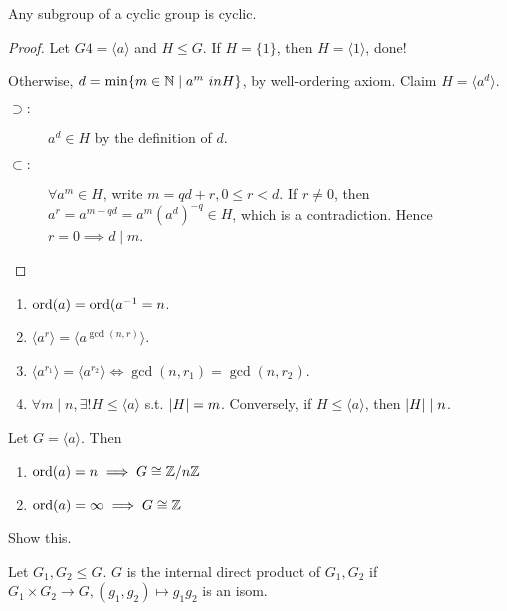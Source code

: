 \begin{prop}
  Any subgroup of a cyclic group is cyclic.
  \begin{proof}
    Let $G4 = \langle a \rangle$ and $H \le G$. If $H = \{1\}$, then
    $H = \langle 1 \rangle$, done!

    Otherwise, $d = \min \{ m \in \mathbb{N} \mid a^m \ in H \}$, by well-ordering
    axiom. Claim $H = \langle a^d \rangle$.
    \begin{description}
      \item[$\supset:$] $a^d \in H$ by the definition of $d$.
      \item[$\subset:$] $\forall a^m \in H$, write $m = qd + r, 0 \le r < d$.
        If $r \ne 0$, then $a^r = a^{m - qd} = a^m (a^d)^{-q} \in H$, which
        is a contradiction. Hence $r = 0 \implies d \mid m$.
    \end{description}
  \end{proof}
\end{prop}

\begin{exercise} \mbox{}
  \begin{enumerate}
    \item $\operatorname{ord}(a) = \operatorname{ord}(a^{-1} = n$.
    \item $\langle a^r \rangle = \langle a^{\gcd(n, r)} \rangle$.
    \item $\langle a^{r_1} \rangle = \langle a^{r_2} \rangle \iff
      \gcd(n, r_1) = \gcd(n, r_2)$.
    \item $\forall m \mid n, \exists! H \le \langle a \rangle$ s.t.
      $\lvert H\rvert = m$. Conversely, if $H \le \langle a \rangle$, then
      $\lvert H\rvert \mid n$.
  \end{enumerate}
\end{exercise}

\begin{prop}
  Let $G = \langle a \rangle$. Then
  \begin{enumerate}
    \item $\operatorname{ord}(a) = n \implies G \cong \mathbb{Z}/n\mathbb{Z}$
    \item $\operatorname{ord}(a) = \infty \implies G \cong \mathbb{Z}$
  \end{enumerate}
  \begin{exercise}
    Show this.
  \end{exercise}
\end{prop}

\begin{definition}
  Let $G_1, G_2 \le G$. $G$ is the internal direct product of $G_1, G_2$ if
  $G_1 \times G_2 \to G, (g_1, g_2) \mapsto g_1g_2$ is an isom.
\end{definition}

